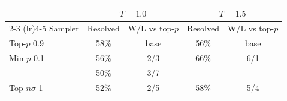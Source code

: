\begin{tabular}{lcccc}
\toprule
 & \multicolumn{2}{c}{$T{=}1.0$} & \multicolumn{2}{c}{$T{=}1.5$} \\
\cmidrule(lr){2-3} \cmidrule(lr){4-5}
Sampler & Resolved & W/L vs top-$p$ & Resolved & W/L vs top-$p$ \\
\midrule
Top-$p$ 0.9 & 58\% & base & 56\% & base \\
Min-$p$ 0.1 & 56\% & 2/3 & 66\% & 6/1 \\
\pless{} & 50\% & 3/7 & -- & -- \\
Top-$n\sigma$ 1 & 52\% & 2/5 & 58\% & 5/4 \\
\bottomrule
\end{tabular}
